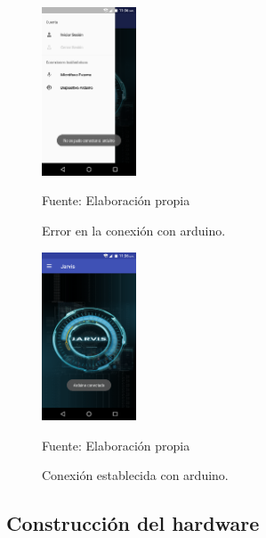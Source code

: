 \begin{figure}[H]
\captionsetup{justification=centering}
\begin{center}
\includegraphics[width=0.25\textwidth]{Imagenes/Cap3/image060}
\end{center}
\begin{center}
\vskip -0.5cm
\caption{\small{Error en la conexión con arduino.}}
\label{fig:figura3.60}
{\small{Fuente: Elaboración propia}}
\end{center}
\end{figure}

\begin{figure}[H]
\captionsetup{justification=centering}
\begin{center}
\includegraphics[width=0.25\textwidth]{Imagenes/Cap3/image061}
\end{center}
\begin{center}
\vskip -0.5cm
\caption{\small{Conexión establecida con arduino.}}
\label{fig:figura3.61}
{\small{Fuente: Elaboración propia}}
\end{center}
\end{figure}

\subsection{Construcción del hardware}
